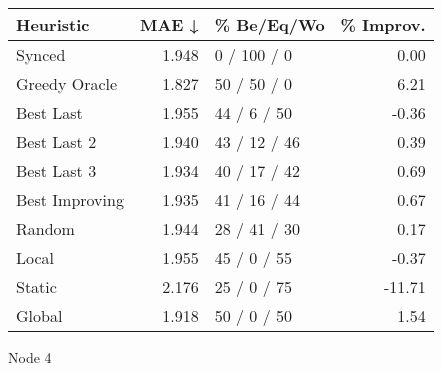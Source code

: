 \begin{tabular}{lrlr}
\toprule
\textbf{Heuristic} & \textbf{MAE ↓} & \textbf{\% Be/Eq/Wo} & \textbf{\% Improv.} \\
\midrule
            Synced &          1.948 &          0 / 100 / 0 &                0.00 \\
     Greedy Oracle &          1.827 &          50 / 50 / 0 &                6.21 \\
         Best Last &          1.955 &          44 / 6 / 50 &               -0.36 \\
       Best Last 2 &          1.940 &         43 / 12 / 46 &                0.39 \\
       Best Last 3 &          1.934 &         40 / 17 / 42 &                0.69 \\
    Best Improving &          1.935 &         41 / 16 / 44 &                0.67 \\
            Random &          1.944 &         28 / 41 / 30 &                0.17 \\
             Local &          1.955 &          45 / 0 / 55 &               -0.37 \\
            Static &          2.176 &          25 / 0 / 75 &              -11.71 \\
            Global &          1.918 &          50 / 0 / 50 &                1.54 \\
\bottomrule
\end{tabular}
\caption{Node 4}
\label{tab:ds_iid_lr05_le2_bs2_4}

